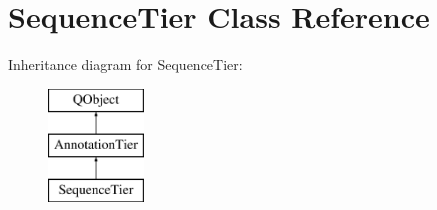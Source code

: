 \hypertarget{class_sequence_tier}{}\section{Sequence\+Tier Class Reference}
\label{class_sequence_tier}
Inheritance diagram for Sequence\+Tier\+:\begin{figure}[H]
\begin{center}
\leavevmode
\includegraphics[height=3.000000cm]{class_sequence_tier}
\end{center}
\end{figure}
